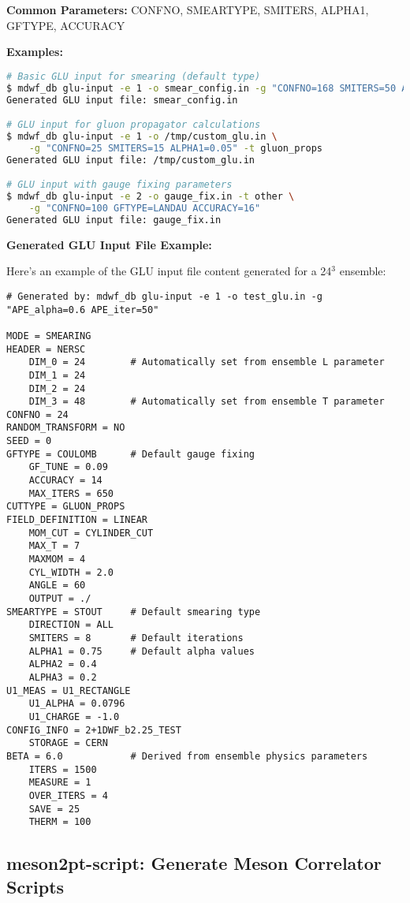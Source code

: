 \documentclass{article}
\begin{document}
\textbf{Common Parameters:}
CONFNO, SMEARTYPE, SMITERS, ALPHA1, GFTYPE, ACCURACY

\textbf{Examples:}
\begin{lstlisting}[language=bash]
# Basic GLU input for smearing (default type)
$ mdwf_db glu-input -e 1 -o smear_config.in -g "CONFNO=168 SMITERS=50 ALPHA1=0.1"
Generated GLU input file: smear_config.in

# GLU input for gluon propagator calculations
$ mdwf_db glu-input -e 1 -o /tmp/custom_glu.in \
    -g "CONFNO=25 SMITERS=15 ALPHA1=0.05" -t gluon_props
Generated GLU input file: /tmp/custom_glu.in

# GLU input with gauge fixing parameters
$ mdwf_db glu-input -e 2 -o gauge_fix.in -t other \
    -g "CONFNO=100 GFTYPE=LANDAU ACCURACY=16"
Generated GLU input file: gauge_fix.in
\end{lstlisting}

\textbf{Generated GLU Input File Example:}

Here's an example of the GLU input file content generated for a 24$^3$ ensemble:

\begin{lstlisting}
# Generated by: mdwf_db glu-input -e 1 -o test_glu.in -g "APE_alpha=0.6 APE_iter=50"

MODE = SMEARING    
HEADER = NERSC
    DIM_0 = 24        # Automatically set from ensemble L parameter
    DIM_1 = 24
    DIM_2 = 24
    DIM_3 = 48        # Automatically set from ensemble T parameter
CONFNO = 24
RANDOM_TRANSFORM = NO
SEED = 0
GFTYPE = COULOMB      # Default gauge fixing
    GF_TUNE = 0.09
    ACCURACY = 14
    MAX_ITERS = 650
CUTTYPE = GLUON_PROPS
FIELD_DEFINITION = LINEAR
    MOM_CUT = CYLINDER_CUT
    MAX_T = 7
    MAXMOM = 4
    CYL_WIDTH = 2.0
    ANGLE = 60
    OUTPUT = ./
SMEARTYPE = STOUT     # Default smearing type
    DIRECTION = ALL
    SMITERS = 8       # Default iterations
    ALPHA1 = 0.75     # Default alpha values
    ALPHA2 = 0.4
    ALPHA3 = 0.2
U1_MEAS = U1_RECTANGLE
    U1_ALPHA = 0.0796
    U1_CHARGE = -1.0
CONFIG_INFO = 2+1DWF_b2.25_TEST
    STORAGE = CERN
BETA = 6.0            # Derived from ensemble physics parameters
    ITERS = 1500
    MEASURE = 1
    OVER_ITERS = 4
    SAVE = 25
    THERM = 100
\end{lstlisting}

\subsection{meson2pt-script: Generate Meson Correlator Scripts}
\end{document}
